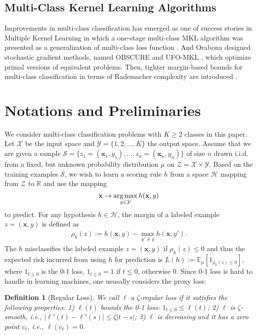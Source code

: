\documentclass{article}
\newcommand{\argmax}{\operatornamewithlimits{arg\,max}}
\newtheorem{definition}{Definition}
\begin{document}
\subsection{Multi-Class Kernel Learning Algorithms}
Improvements in multi-class classification has emerged as one of success stories in Multiple Kernel Learning \cite{ZienO2007}
in which a one-stage multi-class MKL algorithm was presented as a generalization of multi-class loss function \cite{CrammerS02,TsochantaridisHJA04}.
And Orabona designed stochastic gradient methods, named
OBSCURE \cite{OrabonaJC10} and
UFO-MKL \cite{OrabonaL11}, which optimize primal versions of equivalent problems.
Then, tighter margin-based bounds for multi-class classification in terms of Rademacher complexity are introduced \cite{mohri2012foundations,cortes2013multi}.


\section{Notations and Preliminaries}
We consider multi-class classification problems with $K\geq 2$ classes in this paper.
Let $\mathcal{X}$ be the input space and $\mathcal{Y}=\{1,2,\ldots,K\}$ the output space.
Assume that we are given a sample
$
  \mathcal{S}=\{z_1=(\mathbf  x_1,y_1),\ldots, z_n=(\mathbf  x_n,y_n)\}
$
of size $n$ drawn i.i.d. from a fixed,
but unknown probability distribution $\mu$ on $\mathcal{Z}=\mathcal{X}\times\mathcal{Y}$.
Based on the training examples $\mathcal{S}$,
we wish to learn a scoring rule $h$ from a space $\mathcal{H}$ mapping from $\mathcal{Z}$ to $\mathbb{R}$
and use the mapping $$\mathbf x\rightarrow \argmax_{y\in\mathcal{Y}} h(\mathbf x,y)$$ to predict.
For any hypothesis $h\in\mathcal{H}$,
the margin of a labeled example $z=(\mathbf x,y)$ is defined as
\begin{align*}
  \rho_h(z):= h(\mathbf x,y)-\max_{y'\not =y} h(\mathbf x,y').
\end{align*}
The $h$ misclassifies the labeled example $z=(\mathbf x,y)$
if $\rho_h(z)\leq 0$ and thus the expected risk incurred
from using $h$ for prediction is
$
  L(h):=\mathbb{E}_\mu[1_{\rho_h(z)\leq 0}],
$
where $1_{t\leq 0}$ is the 0-1 loss,
$1_{t\leq 0}=1$ if $t\leq 0$, otherwise 0.
Since 0-1 loss is hard to handle in learning machines,
one ususally considers the proxy loss:
\begin{definition}[Regular Loss]
  We call $\ell$ a $\zeta$-regular loss if it satisfies the following properties:
  1) $\ell(t)$ bounds the 0-1 loss: $1_{t\leq 0}\leq \ell(t)$;
  2) $\ell$ is $\zeta$-smooth, i.e., $|\ell'(t)-\ell'(s)|\leq \zeta|t-s|$;
  3) $\ell$ is decreasing and it has a zero point $c_\ell$, i.e., $\ell(c_\ell)=0$.
\end{definition}
\end{document}
